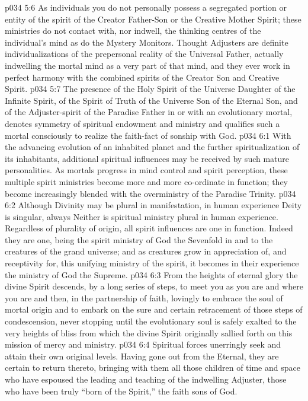 \vs p034 5:6 \pc As individuals you do not personally possess a segregated portion or entity of the spirit of the Creator Father\hyp{}Son or the Creative Mother Spirit; these ministries do not contact with, nor indwell, the thinking centres of the individual’s mind as do the Mystery Monitors. Thought Adjusters are definite individualizations of the prepersonal reality of the Universal Father, actually indwelling the mortal mind as a very part of that mind, and they ever work in perfect harmony with the combined spirits of the Creator Son and Creative Spirit.
\vs p034 5:7 The presence of the Holy Spirit of the Universe Daughter of the Infinite Spirit, of the Spirit of Truth of the Universe Son of the Eternal Son, and of the Adjuster\hyp{}spirit of the Paradise Father in or with an evolutionary mortal, denotes symmetry of spiritual endowment and ministry and qualifies such a mortal consciously to realize the faith\hyp{}fact of sonship with God.
\vs p034 6:1 With the advancing evolution of an inhabited planet and the further spiritualization of its inhabitants, additional spiritual influences may be received by such mature personalities. As mortals progress in mind control and spirit perception, these multiple spirit ministries become more and more co\hyp{}ordinate in function; they become increasingly blended with the overministry of the Paradise Trinity.
\vs p034 6:2 Although Divinity may be plural in manifestation, in human experience Deity is singular, always  Neither is spiritual ministry plural in human experience. Regardless of plurality of origin, all spirit influences are one in function. Indeed they are one, being the spirit ministry of God the Sevenfold in and to the creatures of the grand universe; and as creatures grow in appreciation of, and receptivity for, this unifying ministry of the spirit, it becomes in their experience the ministry of God the Supreme.
\vs p034 6:3 \pc From the heights of eternal glory the divine Spirit descends, by a long series of steps, to meet you as you are and where you are and then, in the partnership of faith, lovingly to embrace the soul of mortal origin and to embark on the sure and certain retracement of those steps of condescension, never stopping until the evolutionary soul is safely exalted to the very heights of bliss from which the divine Spirit originally sallied forth on this mission of mercy and ministry.
\vs p034 6:4 Spiritual forces unerringly seek and attain their own original levels. Having gone out from the Eternal, they are certain to return thereto, bringing with them all those children of time and space who have espoused the leading and teaching of the indwelling Adjuster, those who have been truly “born of the Spirit,” the faith sons of God.

